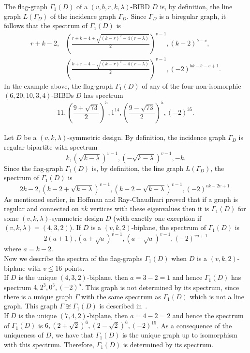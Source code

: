 \documentclass[letterpaper,10pt]{article}
\theoremstyle{plain}
\theoremstyle{definition}
\begin{document}
The flag-graph $\Gamma_1(D)$ of a $(v,b,r,k,\lambda)$-BIBD $D$ is, by definition, the line graph $L(\Gamma_D)$ of the incidence graph $\Gamma_D$. 
Since $\Gamma_D$ is a biregular graph, it follows that the spectrum of  $\Gamma_1(D)$  is
\begin{align*}
r+k-2,&\left(\frac{r+k-4+\sqrt{(k-r)^2-4(r-\lambda)} }{2}\right)^{v-1}, (k-2)^{b-v}, \\
&\left(\frac{k+r-4 - \sqrt{(k-r)^2-4(r-\lambda)}}{2}\right)^{v-1}, (-2)^{bk-b-v+1}.
\end{align*}
In the example above, the flag-graph $\Gamma_1(D)$ of any of the four non-isomorphic $(6, 20, 10, 3, 4)$-BIBDs $D$ has spectrum
\[
11, \left(\frac{9+\sqrt{73}}{2}\right)^{5}, 1^{14} ,\left(\frac{9-\sqrt{73}}{2}\right)^{5}, (-2)^{35}.
\]\\
 
Let $D$ be a $(v,k,\lambda)$-symmetric design.  
By definition, the incidence graph $\Gamma_D$  is regular bipartite with spectrum \[k, (\sqrt{k-\lambda})^{v-1}, (-\sqrt{k-\lambda})^{v-1} , -k.\] 
Since the flag-graph $\Gamma_1(D)$ is, by definition, the line graph $L(\Gamma_D)$,  the  spectrum of $\Gamma_1(D)$ is 
\[2k-2, (k - 2 + \sqrt{k-\lambda})^{v-1}, (k - 2-\sqrt{k-\lambda} )^{v-1}, (-2)^{vk - 2v + 1}.\] 
As mentioned earlier, in \cite{HR2} Hoffman and Ray-Chaudhuri proved that if a graph is regular and connected on $vk$ vertices with these eigenvalues then it is $\Gamma_1(D)$ for some $(v,k,\lambda)$-symmetric design $D$ (with exactly one exception if $(v,k,\lambda)=(4,3,2)$).
If $D$ is a $(v,k,2)$-biplane,  the spectrum of $\Gamma_1(D)$ is 
\[
2(a+1), (a + \sqrt{a})^{v-1}, (a -\sqrt{a} )^{v-1}, (-2)^{va + 1}
\]
where $a = k-2$.\\

Now we describe the spectra of the flag-graphs $\Gamma_1(D)$ when $D$ is a $(v,k,2)$-biplane with $v  \leq 16$ points.\\ 

If $D$ is the unique $(4,3,2)$-biplane, then $a= 3-2 = 1$ and hence $\Gamma_1(D)$ %
has spectrum $4, 2^3, 0^3, (-2)^5$. This graph is not determined by its spectrum, since there is a unique graph $\Gamma$ with the same spectrum as $\Gamma_1(D)$ which is not a line graph. 
This graph $\Gamma \not\cong\Gamma_1(D)$ is described in~\cite{HR2}.\\ 

If $D$ is the unique $(7,4,2)$-biplane, 
then $a = 4-2 =2$ and hence the spectrum of $\Gamma_1(D)$ is $6, (2+\sqrt{2})^6, (2-\sqrt{2})^6,(-2)^{15}$. 
As a consequence of the uniqueness of $D$, we have that $\Gamma_1(D)$ is the unique graph up to isomorphism with this spectrum.
Therefore, $\Gamma_1(D)$ is determined by its spectrum.\\ 
\end{document}
